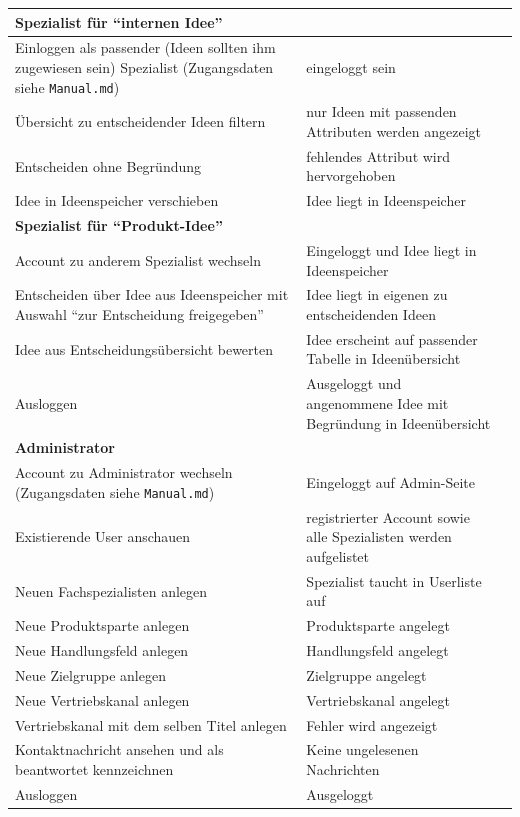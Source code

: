 \begin{center}
\begin{longtable}{|p{}|p{}|p{}|}
        \textbf{Spezialist für \enquote{internen Idee}} & &\\
        \hline
        Einloggen als passender (Ideen sollten ihm zugewiesen sein) Spezialist (Zugangsdaten siehe \texttt{Manual.md})& eingeloggt sein &\\
        \hline
        Übersicht zu entscheidender Ideen filtern & nur Ideen mit passenden Attributen werden angezeigt &\\
        \hline
        Entscheiden ohne Begründung & fehlendes Attribut wird hervorgehoben &\\
        \hline
        Idee in Ideenspeicher verschieben & Idee liegt in Ideenspeicher &\\
        \hline
        \hline

        \textbf{Spezialist für \enquote{Produkt-Idee}} & &\\
        \hline
        Account zu anderem Spezialist wechseln & Eingeloggt und Idee liegt in Ideenspeicher &\\
        \hline
        Entscheiden über Idee aus Ideenspeicher mit Auswahl  \enquote{zur Entscheidung freigegeben} & Idee liegt in eigenen zu entscheidenden Ideen &\\
        \hline
        Idee aus Entscheidungsübersicht bewerten & Idee erscheint auf passender Tabelle in Ideenübersicht &\\
        \hline
        Ausloggen & Ausgeloggt und angenommene Idee mit Begründung in Ideenübersicht &\\
        \hline
        \hline

        \textbf{Administrator} & &\\
        \hline
        Account zu Administrator wechseln (Zugangsdaten siehe \texttt{Manual.md})& Eingeloggt auf Admin-Seite &\\
        \hline
        Existierende User anschauen & registrierter Account sowie alle Spezialisten werden aufgelistet &\\
        \hline
        Neuen Fachspezialisten anlegen & Spezialist taucht in Userliste auf &\\
        \hline
        Neue Produktsparte anlegen & Produktsparte angelegt &\\
        \hline
        Neue Handlungsfeld anlegen & Handlungsfeld angelegt &\\
        \hline
        Neue Zielgruppe anlegen & Zielgruppe angelegt &\\
        \hline
        Neue Vertriebskanal anlegen & Vertriebskanal angelegt &\\
        \hline
        Vertriebskanal mit dem selben Titel anlegen & Fehler wird angezeigt &\\
        \hline
        Kontaktnachricht ansehen und als beantwortet kennzeichnen & Keine ungelesenen Nachrichten &\\
        \hline
        Ausloggen & Ausgeloggt &\\
        \hline
    \end{longtable}
\end{center}


